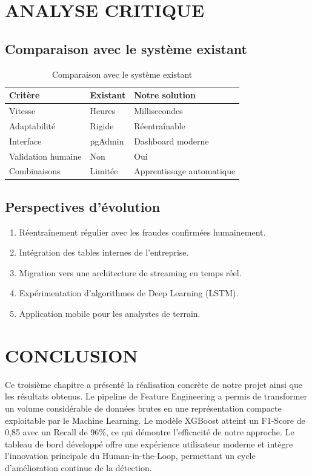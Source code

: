 \documentclass[12pt, oneside, a4paper]{report}
\begin{document}
\section{ANALYSE CRITIQUE}

\subsection{Comparaison avec le système existant}
\begin{table}[htbp]
\centering
\caption{Comparaison avec le système existant}
\label{tab:comparaison-finale}
\vspace{0.3cm}
\renewcommand{\arraystretch}{1.3}
\begin{tabular}{|l|l|l|}
\hline
\textbf{Critère} & \textbf{Existant} & \textbf{Notre solution} \\
\hline
Vitesse & Heures & Millisecondes \\
\hline
Adaptabilité & Rigide & Réentraînable \\
\hline
Interface & pgAdmin & Dashboard moderne \\
\hline
Validation humaine & Non & Oui \\
\hline
Combinaisons & Limitée & Apprentissage automatique \\
\hline
\end{tabular}
\end{table}


\subsection{Perspectives d'évolution}
\begin{enumerate}
\item Réentraînement régulier avec les fraudes confirmées humainement.
\item Intégration des tables internes de l'entreprise.
\item Migration vers une architecture de streaming en temps réel.
\item Expérimentation d'algorithmes de Deep Learning (LSTM).
\item Application mobile pour les analystes de terrain.
\end{enumerate}

\section{CONCLUSION}
Ce troisième chapitre a présenté la réalisation concrète de notre projet ainsi que les résultats obtenus. Le pipeline de Feature Engineering a permis de transformer un volume considérable de données brutes en une représentation compacte exploitable par le Machine Learning. Le modèle XGBoost atteint un F1-Score de 0,85 avec un Recall de 96\%, ce qui démontre l'efficacité de notre approche. Le tableau de bord développé offre une expérience utilisateur moderne et intègre l'innovation principale du Human-in-the-Loop, permettant un cycle d'amélioration continue de la détection.
\end{document}
